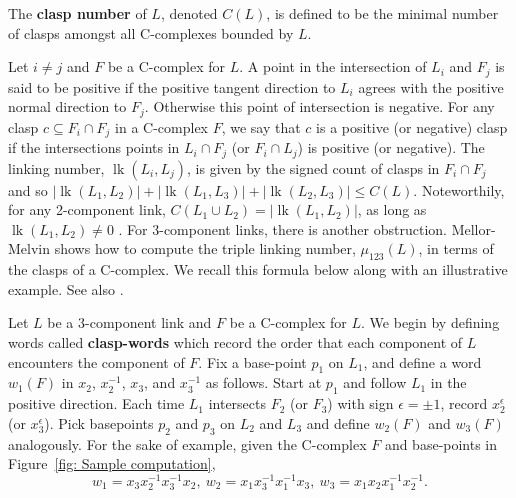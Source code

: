 \documentclass[11pt]{amsart}
\theoremstyle{remark}
\newcommand{\lk}{\operatorname{lk}}
\newcommand{\chris}[1]{\textcolor{purple}{[Chris] #1}}
\begin{document}
The \textbf{clasp number} of $L$, denoted $C(L)$, is defined to be the minimal number of clasps amongst all C-complexes bounded by $L$.  

Let $i\neq j$ and $F$ be a C-complex for $L$. A point in the intersection of $L_i$ and $F_j$ is said to be positive if the positive tangent direction to $L_i$ agrees with the positive normal direction to $F_j$.  Otherwise this point of intersection is negative.   For any clasp $c\subseteq F_i\cap F_j$ in a C-complex $F$, we say that $c$ is a positive (or negative) clasp if the intersections points in $L_i\cap F_j$ (or $F_i\cap L_j$) is positive (or negative).  
The linking number, $\lk(L_i,L_j)$, is given by the signed count of clasps in $F_i\cap F_j$ and so $|\lk(L_1, L_2)|+|\lk(L_1, L_3)|+|\lk(L_2, L_3)|\le C(L)$.  Noteworthily, for any 2-component link, $C(L_1\cup L_2) = |\lk(L_1,L_2)|$, as long as $\lk(L_1,L_2)\neq 0$  \cite{AADG20}.  For 3-component links, there is another obstruction.  Mellor-Melvin \cite{MellorMelvin2003} shows how to compute the triple linking number, $\mu_{123}(L)$, in terms of the clasps of a C-complex.  We recall this formula below along with an illustrative example.  See also \cite[Section 3.1]{DaRo2017}.

  Let $L$ be a 3-component link and $F$ be a C-complex for $L$.  We begin by defining words called \textbf{clasp-words} which record the order that each component of $L$ encounters the component of $F$.  Fix a base-point $p_1$ on $L_1$, and define a word $w_1(F)$ in $x_2$, $x_2^{-1}$, $x_3$, and $x_3^{-1}$ as follows.  Start at $p_1$ and follow $L_1$ in the positive direction.  Each time $L_1$ intersects $F_2$ (or $F_3$) with sign $\epsilon = \pm1$, record $x_2^\epsilon$ (or $x_3^\epsilon$).  Pick basepoints $p_2$ and $p_3$ on $L_2$ and $L_3$ and define $w_2(F)$ and $w_3(F)$ analogously.  For the sake of example, given the C-complex $F$ and base-points in Figure~\ref{fig: Sample computation},  %
\begin{equation}\label{eqn:claspwords}
w_1=x_3x_2^{-1}x_3^{-1}x_2,~
w_2=x_1x_3^{-1}x_1^{-1}x_3,~
w_3=x_1x_2x_1^{-1}x_2^{-1}.
\end{equation}
\end{document}

